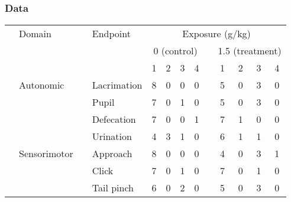 \subsection{}
\begin{frame}
\frametitle{Data}

\begin{table}[h!]
\footnotesize
\renewcommand{\tabcolsep}{0.5pc} %
\renewcommand{\arraystretch}{.6} %
\centering
\begin{tabular}{lll l cccc c cccc}
&Domain & & Endpoint & \multicolumn{9}{c}{Exposure (g/kg)}\\
       &&         && \multicolumn{4}{c}{0 (control)}   &&
       \multicolumn{4}{c}{1.5 (treatment)}\\
\cmidrule{5-8}\cmidrule{10-13}
          &             &
&& 1 & 2 & 3 & 4 && 1 & 2 & 3 & 4  \\
\cmidrule{5-8}\cmidrule{10-13}

&\textcolor{cambridgedarkblue}{Autonomic}

&& \textcolor{cambridgedarkorange}{Lacrimation} &   8   &   0   &   0   &  0  &&
                  5   &   0   &   3   &  0\\

&&&\textcolor{cambridgedarkorange}{Pupil } &        7   &   0   &   1   &  0  &&
                  5   &   0   &   3   &  0\\

&&&\textcolor{cambridgedarkorange}{Defecation} &    7   &   0   &   0   &  1  &&
                  7   &   1   &   0   &  0\\

&&&\textcolor{cambridgedarkorange}{Urination} &     4   &   3   &   1   &  0  &&
                  6   &   1   &   1   &  0\\
                  
                  \midrule

&\textcolor{cambridgedarkblue}{Sensorimotor}

&& \textcolor{cambridgedarkorange}{Approach}  &   8   &   0   &   0   &  0  &&
                 4   &   0   &   3   &  1\\

&&& \textcolor{cambridgedarkorange}{Click}  &       7   &   0   &   1   &  0  &&
                  7   &   0   &   1   &  0\\

&&& \textcolor{cambridgedarkorange}{Tail pinch}  &   6   &   0   &   2   &  0  &&
                   5   &   0   &   3   &  0\\


\end{tabular}
\end{table}
\end{frame}

